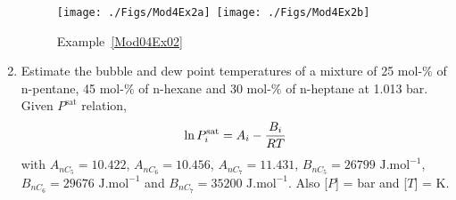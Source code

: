 \begin{enumerate}[1)]
      \begin{figure}[h]
         \vbox{
             \hbox{\texttt{[image: ./Figs/Mod4Ex2a]}
                   \texttt{[image: ./Figs/Mod4Ex2b]}}}
         \caption{Example~\ref{Mod04Ex02}}
      \end{figure}
\clearpage
   \item\label{Mod04Ex03} Estimate the bubble and dew point temperatures of a mixture of 25 mol-$\%$ of n-pentane, 45 mol-$\%$ of n-hexane and 30 mol-$\%$ of n-heptane at 1.013 bar. Given $P^{\text{sat}}$ relation,
    \begin{displaymath}
      \ln{P_{i}^{\text{sat}}} = A_{i} - \displaystyle\frac{B_{i}}{RT}
    \end{displaymath}
    with $A_{nC_{5}}=10.422$, $A_{nC_{6}}=10.456$, $A_{nC_{7}}=11.431$, $B_{nC_{5}}=26799 \text{ J.mol}^{-1}$, $B_{nC_{6}}=29676 \text{ J.mol}^{-1}$ and $B_{nC_{7}}=35200 \text{ J.mol}^{-1}$. Also [$P$] = bar and [$T$] = K.


\end{enumerate}
